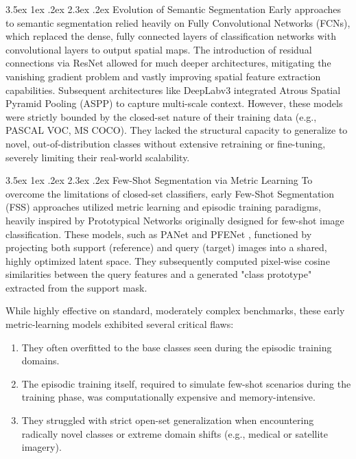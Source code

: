 \documentclass[journal,12pt,onecolumn,draftclsnofoot]{IEEEtran}
\makeatletter
\renewcommand{\section}{\@startsection{section}{1}{\z@}%
    {3.5ex \@plus 1ex \@minus .2ex}%
    {2.3ex \@plus.2ex}%
    {\normalfont\Large\bfseries}}
\makeatother
\begin{document}
\section{Evolution of Semantic Segmentation}
Early approaches to semantic segmentation relied heavily on Fully Convolutional Networks (FCNs), which replaced the dense, fully connected layers of classification networks with convolutional layers to output spatial maps. The introduction of residual connections via ResNet allowed for much deeper architectures, mitigating the vanishing gradient problem and vastly improving spatial feature extraction capabilities. Subsequent architectures like DeepLabv3 integrated Atrous Spatial Pyramid Pooling (ASPP) to capture multi-scale context. However, these models were strictly bounded by the closed-set nature of their training data (e.g., PASCAL VOC, MS COCO). They lacked the structural capacity to generalize to novel, out-of-distribution classes without extensive retraining or fine-tuning, severely limiting their real-world scalability.

\section{Few-Shot Segmentation via Metric Learning}
To overcome the limitations of closed-set classifiers, early Few-Shot Segmentation (FSS) approaches utilized metric learning and episodic training paradigms, heavily inspired by Prototypical Networks originally designed for few-shot image classification. These models, such as PANet \cite{wang2019panet} and PFENet \cite{tian2020pfenet}, functioned by projecting both support (reference) and query (target) images into a shared, highly optimized latent space. They subsequently computed pixel-wise cosine similarities between the query features and a generated "class prototype" extracted from the support mask. 

While highly effective on standard, moderately complex benchmarks, these early metric-learning models exhibited several critical flaws:
\begin{enumerate}
    \item They often overfitted to the base classes seen during the episodic training domains.
    \item The episodic training itself, required to simulate few-shot scenarios during the training phase, was computationally expensive and memory-intensive.
    \item They struggled with strict open-set generalization when encountering radically novel classes or extreme domain shifts (e.g., medical or satellite imagery).
\end{enumerate}
\end{document}
